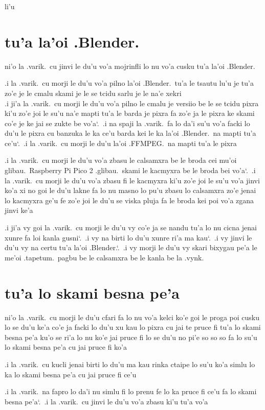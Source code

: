 \documentclass{report}
\newcommand\sds{\spacefactor\sfcode`.\ \space}
\begin{document}
li'u

\section{tu'a la'oi .Blender.}
ni'o la .varik.\ cu jinvi le du'u vo'a mojrinfli lo nu vo'a cusku tu'a la'oi .Blender.

.i la .varik.\ cu morji le du'u vo'a pilno la'oi .Blender.\ tu'a le tsautu lu'u je tu'a zo'e je le cmalu skami je le se tcidu sarlu je le na'e xekri \\
.i ji'a la .varik.\ cu morji le du'u vo'a pilno le cmalu je versiio be le se tcidu pixra ki'u zo'e joi le su'u na'e mapti tu'a le barda je pixra fa zo'e ja le pixra ke skami co'e je ke jai se zukte be vo'a\sds  .i na spaji la .varik.\ fa lo da'i su'u vo'a facki lo du'u le pixra cu banzuka le ka ce'u barda kei le ka la'oi .Blender.\ na mapti tu'a ce'u\sds  .i la .varik.\ cu morji le du'u la'oi .FFMPEG.\ na mapti tu'a le pixra

.i la .varik.\ cu morji le du'u vo'a zbasu le calsamxra be le broda cei mu'oi glibau.\ Raspberry Pi Pico 2 .glibau.\ skami le kacmyxra be le broda bei vo'a\sds  .i la .varik.\ cu morji le du'u vo'a zbasu fi le kacmyxra ki'u zo'e joi le su'u vo'a jinvi ko'a xi no goi le du'u lakne fa lo nu masno lo pu'u zbasu lo calsamxra zo'e jenai lo kacmyxra ge'u fe zo'e joi le du'u se viska pluja fa le broda kei poi vo'a zgana jinvi ke'a

.i ji'a vy goi la .varik.\ cu morji le du'u vy co'e ja se nandu tu'a lo nu cicna jenai xunre fa loi kanla gusni\sds  .i vy na birti lo du'u xunre ri'a ma kau\sds  .i vy jinvi le du'u vy na certu tu'a la'oi .Blender.\sds  .i vy morji le du'u vy skari bixygau pe'a le me'oi .tapetum.\ pagbu be le calsamxra be le kanla be la .vynk.

\section{tu'a lo skami besna pe'a}
ni'o la .varik.\ cu morji le du'u cfari fa lo nu vo'a kelci ko'e goi le proga poi cusku lo se du'u ke'a co'e ja facki lo du'u xu kau lo pixra cu jai te pruce fi tu'a lo skami besna pe'a ku'o se ri'a lo nu ko'e jai pruce fi lo se du'u no pi'e so so so fa lo su'u lo skami besna pe'a cu jai pruce fi ko'a

.i la .varik.\ cu kucli jenai birti lo du'u ma kau rinka ctaipe lo su'u ko'a simlu lo ka lo skami besna pe'a cu jai pruce fi ce'u

.i la .varik.\ na fapro lo da'i nu simlu fi lo prenu fe lo ka pruce fi ce'u fa lo skami besna pe'a\sds  .i la .varik.\ cu jinvi le du'u vo'a zbasu ki'u tu'a vo'a
\end{document}
